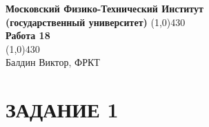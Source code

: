 \documentclass[a4paper, 12pt]{article}%
\begin{document}
\begin{titlepage}

\begin{center}
\large\textbf{Московский Физико-Технический Институт}\\
\large\textbf{(государственный университет)}
\vfill
\line(1,0){430}\\[1mm]
\huge\textbf{Работа 18}\\
\line(1,0){430}\\[1mm]
\vfill
\large Балдин Виктор, ФРКТ\\
\end{center}

\end{titlepage}

\section*{ЗАДАНИЕ 1}
\end{document}

